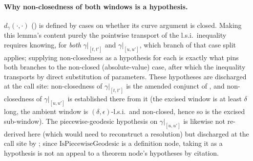 \begin{lemma}
  \paragraph{Why non-closedness of both windows is a hypothesis.} $d_\gamma(\cdot,\cdot)$
  () is defined by cases on whether its curve argument is closed. Making this
  lemma's content purely the pointwise transport of the l.s.i.\ inequality requires knowing, for
  \emph{both} $\gamma|_{[t,t']}$ and $\gamma|_{[u,u']}$, which branch of that case split applies;
  supplying non-closedness as a hypothesis for each is exactly what pins both branches to the
  non-closed (absolute-value) case, after which the inequality transports by direct substitution
  of parameters. These hypotheses are discharged at the call site: non-closedness of
  $\gamma|_{[t,t']}$ is the amended conjunct of , and non-closedness
  of $\gamma|_{[u,u']}$ is established there from it (the excised window is at least $\delta$
  long, the ambient window is $(\delta,\epsilon)$-l.s.i.\ and non-closed, hence so is the excised
  sub-window). The piecewise-geodesic hypothesis on $\gamma|_{[u,u']}$ is likewise not re-derived
  here (which would need to reconstruct a resolution) but discharged at the call site by
  ; since $\mathrm{IsPiecewiseGeodesic}$ is a definition node,
  taking it as a hypothesis is not an appeal to a theorem node's hypotheses by citation.
\end{lemma}
